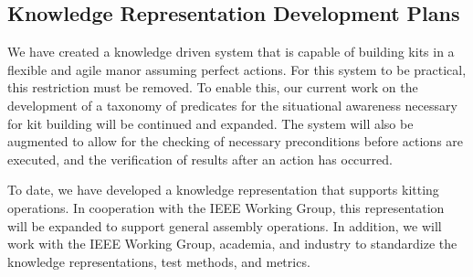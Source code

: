 \subsection{Knowledge Representation Development Plans}
We have created a knowledge driven system that is capable of building
kits in a flexible and agile manor assuming perfect actions. For this system
to be practical, this restriction must be removed. 
To enable this, our current work on the development of a taxonomy of
predicates for the situational awareness necessary for kit building will
be continued and expanded. The system will also be augmented to
allow for the checking of necessary preconditions before actions are
executed, and the verification of results after an action has occurred.

To date, we have developed a knowledge representation that supports
kitting operations. In cooperation with the IEEE Working Group, this
representation will be expanded to support general assembly operations.
In addition, we will work with the IEEE Working Group, academia, and 
industry to standardize the knowledge representations, test methods,
and metrics.